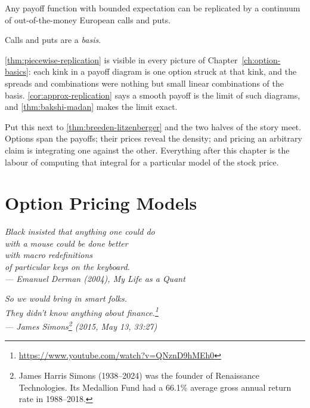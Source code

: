 \begin{theorem}
	\label{thm:bakshi-madan}
	Any payoff function with bounded expectation can be replicated by a continuum of out-of-the-money European calls and puts.
\end{theorem}

\suppstart
\begin{moral}
	Calls and puts are a \emph{basis}.

	\autoref{thm:piecewise-replication} is visible in every picture of Chapter~\ref{ch:option-basics}: each kink in a payoff diagram is one option struck at that kink, and the spreads and combinations were nothing but small linear combinations of the basis. \autoref{cor:approx-replication} says a smooth payoff is the limit of such diagrams, and \autoref{thm:bakshi-madan} makes the limit exact.

	Put this next to \autoref{thm:breeden-litzenberger} and the two halves of the story meet.
	Options span the payoffs; their prices reveal the density; and pricing an arbitrary claim is integrating one against the other.
	Everything after this chapter is the labour of computing that integral for a particular model of the stock price.
\end{moral}
\suppend

\chapter{Option Pricing Models}
\label{ch:pricing-models}


\begin{flushright}
	\itshape Black insisted that anything one could do\\
	with a mouse could be done better\\
	with macro redefinitions\\
	of particular keys on the keyboard.\\
	\upshape --- Emanuel Derman (2004), \itshape My Life as a Quant\upshape

	\medskip

	\itshape So we would bring in smart folks.\\
	They didn't know anything about finance.\footnote{\url{https://www.youtube.com/watch?v=QNznD9hMEh0}}\\
	\upshape --- James Simons\footnote{James Harris Simons (1938--2024) was the founder of Renaissance Technologies. Its Medallion Fund had a 66.1\% average gross annual return rate in 1988--2018.} (2015, May 13, 33:27)
\end{flushright}

